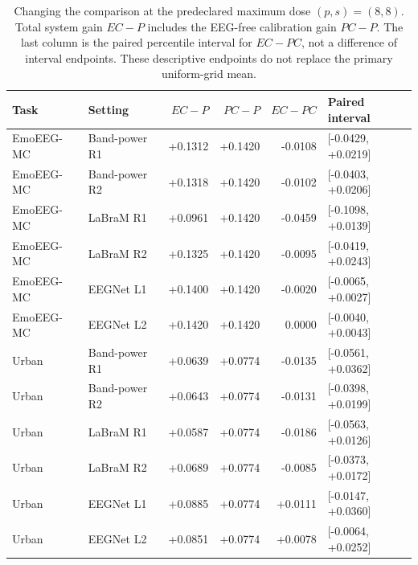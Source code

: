 \begin{table}[t]
\centering\small
\caption{Changing the comparison at the predeclared maximum dose $(p,s)=(8,8)$. Total system gain $EC-P$ includes the EEG-free calibration gain $PC-P$. The last column is the paired percentile interval for $EC-PC$, not a difference of interval endpoints. These descriptive endpoints do not replace the primary uniform-grid mean.}
\label{tab:resource-decomposition}
\begin{tabular}{@{}llrrrl@{}}
\toprule
Task & Setting & $EC-P$ & $PC-P$ & $EC-PC$ & Paired interval \\
\midrule
EmoEEG-MC & Band-power R1 & +0.1312 & +0.1420 & -0.0108 & [-0.0429, +0.0219] \\
EmoEEG-MC & Band-power R2 & +0.1318 & +0.1420 & -0.0102 & [-0.0403, +0.0206] \\
EmoEEG-MC & LaBraM R1 & +0.0961 & +0.1420 & -0.0459 & [-0.1098, +0.0139] \\
EmoEEG-MC & LaBraM R2 & +0.1325 & +0.1420 & -0.0095 & [-0.0419, +0.0243] \\
EmoEEG-MC & EEGNet L1 & +0.1400 & +0.1420 & -0.0020 & [-0.0065, +0.0027] \\
EmoEEG-MC & EEGNet L2 & +0.1420 & +0.1420 & 0.0000 & [-0.0040, +0.0043] \\
Urban & Band-power R1 & +0.0639 & +0.0774 & -0.0135 & [-0.0561, +0.0362] \\
Urban & Band-power R2 & +0.0643 & +0.0774 & -0.0131 & [-0.0398, +0.0199] \\
Urban & LaBraM R1 & +0.0587 & +0.0774 & -0.0186 & [-0.0563, +0.0126] \\
Urban & LaBraM R2 & +0.0689 & +0.0774 & -0.0085 & [-0.0373, +0.0172] \\
Urban & EEGNet L1 & +0.0885 & +0.0774 & +0.0111 & [-0.0147, +0.0360] \\
Urban & EEGNet L2 & +0.0851 & +0.0774 & +0.0078 & [-0.0064, +0.0252] \\
\bottomrule
\end{tabular}
\end{table}
